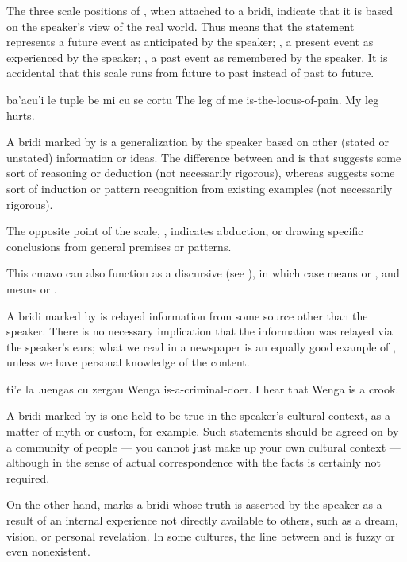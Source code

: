 The three scale positions of , when attached to a
    bridi, indicate that it is based on the speaker's view of the
    real world. Thus  means that the statement represents a
    future event as anticipated by the speaker; , a
    present event as experienced by the speaker; , a
    past event as remembered by the speaker. It is accidental that
    this scale runs from future to past instead of past to future.
\begin{example}
ba'acu'i le tuple be mi cu se cortu\n
{} The leg of me is-the-locus-of-pain.\n
My leg hurts.
\end{example}

A bridi marked by  is a generalization by the speaker
    based on other (stated or unstated) information or ideas. The
    difference between  and  is that 
    suggests some sort of reasoning or deduction (not necessarily
    rigorous), whereas  suggests some sort of induction or
    pattern recognition from existing examples (not necessarily
    rigorous). 

The opposite point of the scale, , indicates
    abduction, or drawing specific conclusions from general
    premises or patterns.

This cmavo can also function as a discursive (see ), in which case  means
     or , and  means
     or .

A bridi marked by  is relayed information from some
    source other than the speaker. There is no necessary
    implication that the information was relayed via the speaker's
    ears; what we read in a newspaper is an equally good example of
    , unless we have personal knowledge of the content.
\begin{example}
ti'e la .uengas cu zergau\n
{} Wenga is-a-criminal-doer.\n
I hear that Wenga is a crook.
\end{example}

A bridi marked by  is one held to be true in the
    speaker's cultural context, as a matter of myth or custom, for
    example. Such statements should be agreed on by a community of
    people --- you cannot just make up your own cultural context
    --- although  in the sense of actual
    correspondence with the facts is certainly not required. 

On the other hand,  marks a bridi whose truth is
    asserted by the speaker as a result of an internal experience
    not directly available to others, such as a dream, vision, or
    personal revelation. In some cultures, the line between
     and  is fuzzy or even nonexistent.

